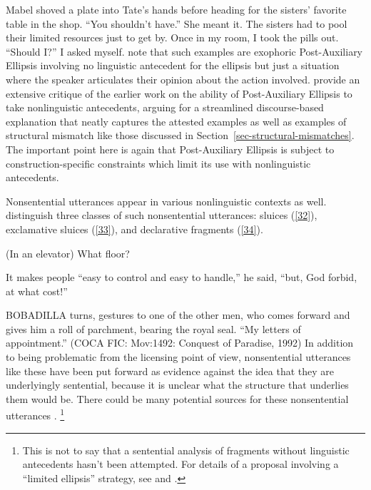\ealnoraggedright
\ex 
Mabel shoved a plate into Tate's hands before heading for the sisters' favorite table in the shop. ``You shouldn't have.'' She meant it. The sisters had to pool their limited resources
just to get by. \citep[ex.\ 23]{Miller2014b}\label{30}
\ex
Once in my room, I took the pills out. ``Should I?'' I asked myself. \citep[ex.\
22a]{Miller2014b}\label{31}
\zl
%
\citet{Miller2014b} note that such examples are exophoric Post-Auxiliary Ellipsis involving no
linguistic antecedent for the ellipsis but just a situation where the speaker articulates their
opinion about the action involved. \citet{Miller2014b} provide an extensive critique of the earlier
work on the ability of Post-Auxiliary Ellipsis to take nonlinguistic antecedents, arguing for a
streamlined discourse-based explanation that neatly captures the attested examples as well as
examples of structural mismatch like those discussed in Section~\ref{sec-structural-mismatches}. The
important point here is again that Post-Auxiliary Ellipsis is subject to construction-specific
constraints which limit its use with nonlinguistic antecedents.

Nonsentential utterances appear in various nonlinguistic contexts as well. \citet{Ginzburg2018}
distinguish three classes of such nonsentential utterances: sluices (\ref{32}), exclamative sluices
(\ref{33}), and declarative fragments (\ref{34}).

\ealnoraggedright
\ex (In an elevator) What floor? \citep[298]{Ginzburg:Sag:2000}\label{32}

\ex It makes people ``easy to control and easy to handle,'' he said, ``but, God forbid, at what cost!'' \citep[96]{Ginzburg2018}
\label{33}

\ex BOBADILLA turns, gestures to one of the other men, who comes forward and gives him a roll of
parchment, bearing the royal seal. ``My letters of appointment.'' (COCA  FIC: Mov:1492: Conquest of
Paradise, 1992)\label{34}
\zl
%
In addition to being problematic from the licensing point of view, nonsentential utterances like these have been put forward as evidence against the idea that they are underlyingly sentential, because it is unclear what the structure that underlies them would be. There could be many potential sources for
these nonsentential utterances 
\citep[see][306]{CJ2005a}.%
\footnote{This is not to say that a sentential analysis of fragments without linguistic antecedents hasn't been attempted. For details of a proposal involving a ``limited ellipsis'' strategy, see \citet{Merchant2005a} and \citet{Merchant2010}.}


